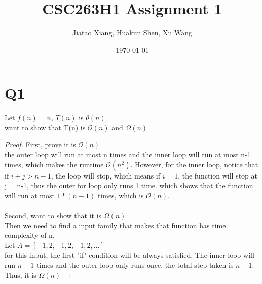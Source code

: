 \documentclass[11pt]{article}
\title{CSC263H1 Assignment 1}
\author{Jiatao Xiang,  Huakun Shen,  Xu Wang}
\date{\today}
\begin{document}
\maketitle
\section*{Q1}
Let $f(n) = n$, $T(n)$ is $\theta(n)$ \\
want to show that T(n) is $\mathcal{O}(n)$ and $\Omega(n)$
\begin{proof}
First, prove it is $\mathcal{O}(n)$\\
the outer loop will run at most n times and the inner loop will run at most n-1 times, which makes the runtime $\mathcal{O}(n^2)$. However, 
for the inner loop, notice that if $i+j>n-1$, the loop will stop, which means if $i=1$, the function will stop at j = n-1, thus the outer for loop only runs 1 time. which shows that the function will run at most $1*(n-1)$ times, which is $\mathcal{O}(n)$.\\
\\
Second, want to show that it is $\Omega(n)$.\\
Then we need to find a input family that makes that function has time complexity of n.\\
Let $A = [-1 , 2,-1,2,-1,2, \dots]$\\
for this input, the first "if" condition will be always satisfied. The inner loop will run $n-1$ times and the outer loop only runs once, the total step taken is $n-1$. Thus, it is $\Omega(n)$
\end{proof}
\end{document}
